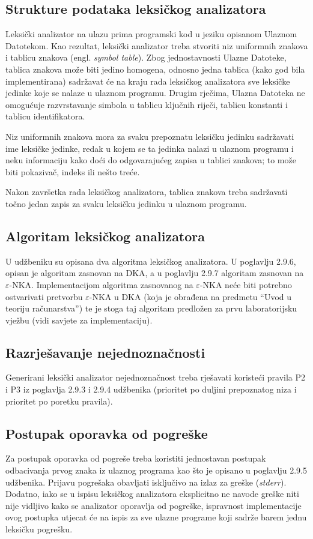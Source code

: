 \documentclass[times, 12pt, utf8]{book}
\begin{document}
\subsection{Strukture podataka leksičkog analizatora}
Leksički analizator na ulazu prima programski kod u jeziku opisanom Ulaznom Datotekom.
Kao rezultat, leksički analizator treba stvoriti niz uniformnih znakova i tablicu znakova (engl. \emph{symbol table}).
Zbog jednostavnosti Ulazne Datoteke, tablica znakova može biti jedino homogena, odnosno jedna tablica (kako god bila implementirana) sadržavat će na kraju rada leksičkog analizatora sve leksičke jedinke koje se nalaze u ulaznom programu.
Drugim rječima, Ulazna Datoteka ne omogućuje razvrstavanje simbola u tablicu ključnih riječi, tablicu konstanti i tablicu identifikatora.

Niz uniformnih znakova mora za svaku prepoznatu leksičku jedinku sadržavati ime leksičke jedinke, redak u kojem se ta jedinka nalazi u ulaznom programu i neku informaciju kako doći do odgovarajućeg zapisa u tablici znakova; to može biti pokazivač, indeks ili nešto treće.

Nakon završetka rada leksičkog analizatora, tablica znakova treba sadržavati točno jedan zapis za svaku leksičku jedinku u ulaznom programu.

\subsection{Algoritam leksičkog analizatora}
U udžbeniku su opisana dva algoritma leksičkog analizatora.
U poglavlju 2.9.6, opisan je algoritam zasnovan na DKA, a u poglavlju 2.9.7 algoritam zasnovan na \(\varepsilon\)-NKA.
Implementacijom algoritma zasnovanog na \(\varepsilon\)-NKA neće biti potrebno ostvarivati pretvorbu \(\varepsilon\)-NKA u DKA (koja je obrađena na predmetu “Uvod u teoriju računarstva”) te je stoga taj algoritam predložen za prvu laboratorijsku vježbu (vidi savjete za implementaciju).

\subsection{Razrješavanje nejednoznačnosti}
Generirani leksički analizator nejednoznačnost treba rješavati koristeći pravila P2 i P3 iz poglavlja 2.9.3 i 2.9.4 udžbenika (prioritet po duljini prepoznatog niza i prioritet po poretku pravila).

\subsection{Postupak oporavka od pogreške}
Za postupak oporavka od pogreše treba koristiti jednostavan postupak odbacivanja prvog znaka iz ulaznog programa kao što je opisano u poglavlju 2.9.5 udžbenika.
Prijavu pogrešaka obavljati isključivo na izlaz za greške (\emph{stderr}).
Dodatno, iako se u ispisu leksičkog analizatora eksplicitno ne navode greške niti nije vidljivo kako se analizator oporavlja od pogreške, ispravnost implementacije ovog postupka utjecat će na ispis za sve ulazne programe koji sadrže barem jednu leksičku pogrešku.
\end{document}
